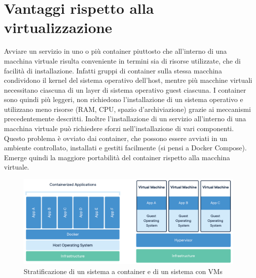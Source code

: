 \section{Vantaggi rispetto alla virtualizzazione}
Avviare un servizio in uno o più container piuttosto che all'interno di una macchina virtuale risulta conveniente in termini sia di risorse utilizzate, che di facilità di installazione. Infatti gruppi di container sulla stessa macchina condividono il kernel del sistema operativo dell'host, mentre più macchine virtuali necessitano ciascuna di un layer di sistema operativo guest ciascuna. I container sono quindi più leggeri, non richiedono l'installazione di un sistema operativo e utilizzano meno risorse (RAM, CPU, spazio d'archiviazione) grazie ai meccanismi precedentemente descritti. Inoltre l'installazione di un servizio all'interno di una macchina virtuale può richiedere sforzi nell'installazione di vari componenti. Questo problema è ovviato dai container, che possono essere avviati in un ambiente controllato, installati e gestiti facilmente (si pensi a Docker Compose). Emerge quindi la maggiore portabilità del container rispetto alla macchina virtuale.
\begin{figure}[h]
    \centering
    \includegraphics[width=\textwidth]{immagini/docker-containerized-and-vm-transparent-bg.png}
    \caption{Stratificazione di un sistema a container e di un sistema con VMs}
    \label{fig:container-vs-VM}
\end{figure}